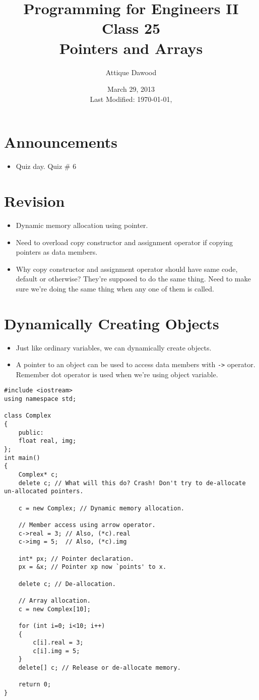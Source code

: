 \documentclass[12pt,a4paper]{article}
\title{\vspace{-2cm}Programming for Engineers II\\Class 25\\Pointers and Arrays}
\author{Attique Dawood}
\date{March 29, 2013\\[0.2cm] Last Modified: \today, \currenttime}
\begin{document}
\maketitle
\section{Announcements}
\begin{itemize}
\item Quiz day. Quiz \# 6
\end{itemize}
\section{Revision}
\begin{itemize}
\item Dynamic memory allocation using pointer.
\item Need to overload copy constructor and assignment operator if copying pointers as data members.
\item Why copy constructor and assignment operator should have same code, default or otherwise? They're supposed to do the same thing. Need to make sure we're doing the same thing when any one of them is called.
\end{itemize}
\section{Dynamically Creating Objects}
\begin{itemize}
\item Just like ordinary variables, we can dynamically create objects.
\item A pointer to an object can be used to access data members with \verb|->| operator. Remember dot operator is used when we're using object variable.
\end{itemize}
\begin{lstlisting}[caption={Pointers to Objects}]
#include <iostream>
using namespace std;

class Complex
{
	public:
	float real, img;
};
int main()
{
	Complex* c;
	delete c; // What will this do? Crash! Don't try to de-allocate un-allocated pointers.

	c = new Complex; // Dynamic memory allocation.

	// Member access using arrow operator.
	c->real = 3; // Also, (*c).real
	c->img = 5;  // Also, (*c).img

	int* px; // Pointer declaration.
	px = &x; // Pointer xp now `points' to x.

	delete c; // De-allocation.

	// Array allocation.
	c = new Complex[10];

	for (int i=0; i<10; i++)
	{
		c[i].real = 3;
		c[i].img = 5;
	}
	delete[] c; // Release or de-allocate memory.

	return 0;
}
\end{lstlisting}
\end{document}
